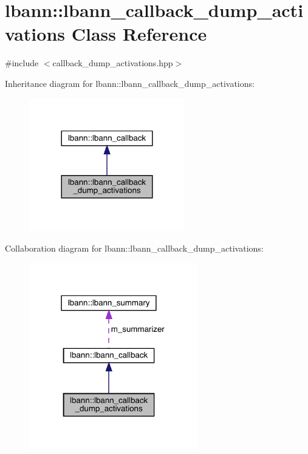 \hypertarget{classlbann_1_1lbann__callback__dump__activations}{}\section{lbann\+:\+:lbann\+\_\+callback\+\_\+dump\+\_\+activations Class Reference}
\label{classlbann_1_1lbann__callback__dump__activations}


{\ttfamily \#include $<$callback\+\_\+dump\+\_\+activations.\+hpp$>$}



Inheritance diagram for lbann\+:\+:lbann\+\_\+callback\+\_\+dump\+\_\+activations\+:\nopagebreak
\begin{figure}[H]
\begin{center}
\leavevmode
\includegraphics[width=192pt]{classlbann_1_1lbann__callback__dump__activations__inherit__graph}
\end{center}
\end{figure}


Collaboration diagram for lbann\+:\+:lbann\+\_\+callback\+\_\+dump\+\_\+activations\+:\nopagebreak
\begin{figure}[H]
\begin{center}
\leavevmode
\includegraphics[width=207pt]{classlbann_1_1lbann__callback__dump__activations__coll__graph}
\end{center}
\end{figure}
